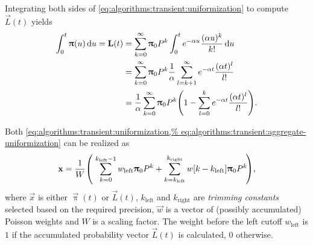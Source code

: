 Integrating both sides of
\vref{eq:algorithms:transient:uniformization} to compute $\vec{L}(t)$
yields~\citep{reibman1989markov}
\begin{align}
  \int_{0}^t \vec{\uppi}(u) \,\dd u = \vec{L}(t)
  &= \sum_{k = 0}^{\infty} \vec{\uppi}_0 P^k \int_{0}^{t} e^{-\alpha
    u} \frac{(\alpha u)^k}{k!} \,\dd u \\
  &= \sum_{k = 0}^{\infty} \vec{\uppi}_0 P^k \frac{1}{\alpha} \sum_{l
    = k + 1}^{\infty} e^{-\alpha t} \frac{(\alpha t)^l}{l!} \\
  &= \frac{1}{\alpha} \sum_{k = 0}^{\infty} \vec{\uppi}_0 P^k \mleft(
    1 - \sum_{l = 0}^{k} e^{-\alpha t} \frac{(\alpha t)^l}{l!}
    \mright) \text.
    \label{eq:algorithms:transient:aggregate-uniformization}
\end{align}

Both \cref{eq:algorithms:transient:uniformization,%
eq:algorithms:transient:aggregate-uniformization} can be realized
as
\begin{equation}
  \vec{x} = \frac{1}{W} \mleft(\; \sum_{k = 0}^{k_{\text{left}} - 1} w_{\text{left}}
  \vec{\uppi}_0 P^k + \sum_{k = k_{\text{left}}}^{k_{\text{right}}}
  w[k - k_{\text{left}}] \vec{\uppi}_0 P^k \!\mright) \text,
  \label{eq:algorithms:transient:uniformization-impl}
\end{equation}
where $\vec{x}$ is either $\vec{\uppi}(t)$ or $\vec{L}(t)$,
$k_{\text{left}}$ and $k_{\text{right}}$ are \emph{trimming constants}
selected based on the required precision, $\vec{w}$ is a vector of
(possibly accumulated) Poisson weights and $W$ is a scaling
factor. The weight before the left cutoff $w_{\text{left}}$ is $1$ if
the accumulated probability vector $\vec{L}(t)$ is calculated, $0$
otherwise.

